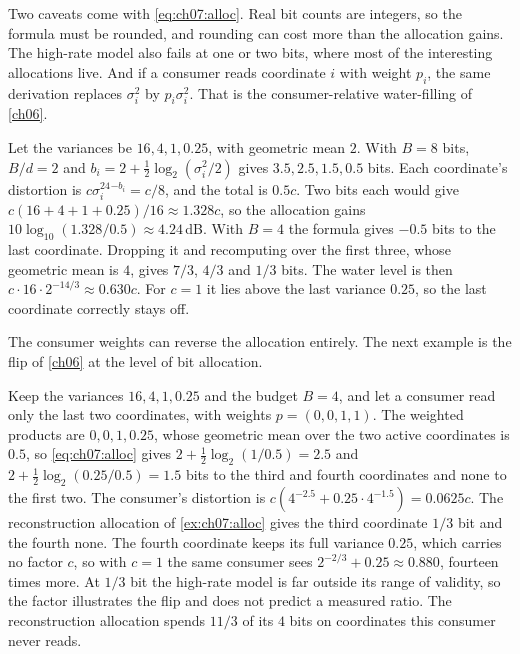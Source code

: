 Two caveats come with \cref{eq:ch07:alloc}. Real bit counts are integers, so the formula must be rounded, and rounding can cost more than the allocation gains. The high-rate model also fails at one or two bits, where most of the interesting allocations live. And if a consumer reads coordinate $i$ with weight $p_i$, the same derivation replaces $\sigma_i^2$ by $p_i\sigma_i^2$. That is the consumer-relative water-filling of \cref{ch06}.

\begin{example}\label{ex:ch07:alloc}
Let the variances be $16,4,1,0.25$, with geometric mean $2$. With $B=8$ bits, $B/d=2$ and $b_i=2+\frac12\log_2(\sigma_i^2/2)$ gives $3.5,2.5,1.5,0.5$ bits. Each coordinate's distortion is $c\sigma_i^24^{-b_i}=c/8$, and the total is $0.5c$. Two bits each would give $c(16+4+1+0.25)/16\approx1.328c$, so the allocation gains $10\log_{10}(1.328/0.5)\approx4.24$\,dB. With $B=4$ the formula gives $-0.5$ bits to the last coordinate. Dropping it and recomputing over the first three, whose geometric mean is $4$, gives $7/3$, $4/3$ and $1/3$ bits. The water level is then $c\cdot16\cdot2^{-14/3}\approx0.630c$. For $c=1$ it lies above the last variance $0.25$, so the last coordinate correctly stays off.
\end{example}

The consumer weights can reverse the allocation entirely. The next example is the flip of \cref{ch06} at the level of bit allocation.

\begin{example}\label{ex:ch07:allocC}
Keep the variances $16,4,1,0.25$ and the budget $B=4$, and let a consumer read only the last two coordinates, with weights $p=(0,0,1,1)$. The weighted products are $0,0,1,0.25$, whose geometric mean over the two active coordinates is $0.5$, so \cref{eq:ch07:alloc} gives $2+\tfrac12\log_2(1/0.5)=2.5$ and $2+\tfrac12\log_2(0.25/0.5)=1.5$ bits to the third and fourth coordinates and none to the first two. The consumer's distortion is $c(4^{-2.5}+0.25\cdot4^{-1.5})=0.0625c$. The reconstruction allocation of \cref{ex:ch07:alloc} gives the third coordinate $1/3$ bit and the fourth none. The fourth coordinate keeps its full variance $0.25$, which carries no factor $c$, so with $c=1$ the same consumer sees $2^{-2/3}+0.25\approx0.880$, fourteen times more. At $1/3$ bit the high-rate model is far outside its range of validity, so the factor illustrates the flip and does not predict a measured ratio. The reconstruction allocation spends $11/3$ of its $4$ bits on coordinates this consumer never reads.
\end{example}

